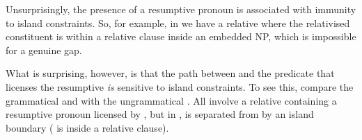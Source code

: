 \documentclass[output=paper
 	        ,biblatex
                ,babelshorthands
                ,newtxmath
                ,draftmode
                ,colorlinks, citecolor=brown
]{langscibook}
\begin{document}
Unsurprisingly, the presence of a resumptive pronoun is associated with immunity to island
constraints. So, for example, in  we have a relative where the relativised constituent is within a relative clause inside an embedded NP, which is 
impossible for a genuine gap.
\begin{exe}
\end{exe}
What is surprising, however, is that the path between  and the predicate that
licenses the resumptive \emph{is} sensitive to island constraints. To see this, compare
the grammatical  and  with the ungrammatical
. All involve a  relative containing a resumptive pronoun
licensed by , but in ,
 is separated from  by an island boundary ( is inside a relative clause).
\begin{exe}
  \label{x:rc-171}
\end{exe}
\end{document}
